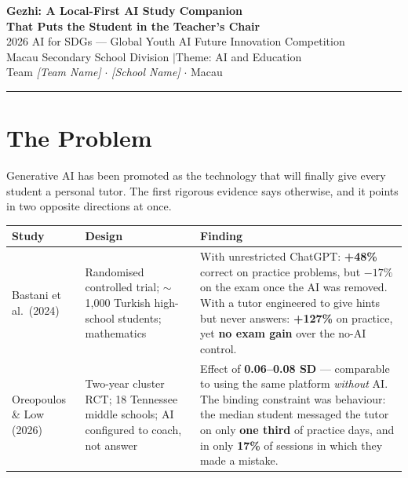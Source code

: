 \documentclass[10pt,a4paper]{article}
\begin{document}
\begin{center}
{\LARGE\bfseries Gezhi: A Local-First AI Study Companion\\[2pt]
That Puts the Student in the Teacher's Chair}\\[6pt]
{\small 2026 AI for SDGs --- Global Youth AI Future Innovation Competition\\
Macau Secondary School Division \quad$\vert$\quad Theme: AI and Education}\\[4pt]
{\footnotesize Team \textit{[Team Name]} $\cdot$ \textit{[School Name]} $\cdot$ Macau}
\end{center}
\vspace{-2pt}
\hrule
\vspace{4pt}

\section{The Problem}

Generative AI has been promoted as the technology that will finally give every student a
personal tutor. The first rigorous evidence says otherwise, and it points in two opposite
directions at once.

\begin{table}[h]
\centering
\footnotesize
\begin{tabularx}{\textwidth}{@{}p{2.9cm} p{3.4cm} X@{}}
\toprule
\textbf{Study} & \textbf{Design} & \textbf{Finding} \\
\midrule
Bastani et al.\ (2024) &
Randomised controlled trial; $\sim$1{,}000 Turkish high-school students; mathematics &
With unrestricted ChatGPT: \textbf{+48\%} correct on practice problems, but \textbf{\(-17\%\)}
on the exam once the AI was removed. With a tutor engineered to give hints but never
answers: \textbf{+127\%} on practice, yet \textbf{no exam gain} over the no-AI control. \\[2pt]
Oreopoulos \& Low (2026) &
Two-year cluster RCT; 18 Tennessee middle schools; AI configured to coach, not answer &
Effect of \textbf{0.06--0.08 SD} --- comparable to using the same platform \emph{without}
AI. The binding constraint was behaviour: the median student messaged the tutor on only
\textbf{one third} of practice days, and in only \textbf{17\%} of sessions in which they
made a mistake. \\
\bottomrule
\end{tabularx}
\end{table}
\end{document}
